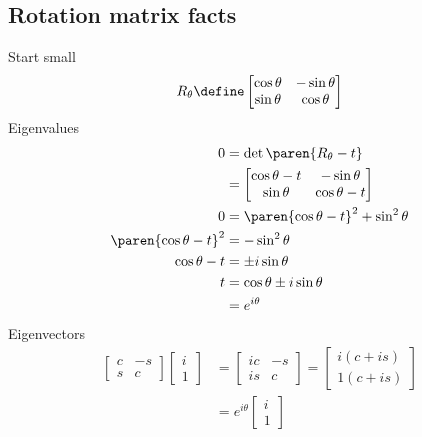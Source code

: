 \documentclass{scrartcl}
\begin{document}
\renewcommand{\b}{u}
\renewcommand{\R}{R}
\begin{multicols*}{2}
  \section{Rotation matrix facts}
  Start small
  \[
    R_\theta \define
    \begin{bmatrix}
      \cos \theta & -\sin\theta \\
      \sin\theta & \cos\theta
    \end{bmatrix}
  \]
  Eigenvalues
  \begin{align*}
    0&=\det\paren{R_\theta- t}\\
     &=
                              \begin{bmatrix}
                                \cos\theta - t & -\sin\theta \\
                                \sin\theta & \cos\theta - t
                              \end{bmatrix} \\
    0&=\paren{\cos\theta - t}^2 + \sin^2\theta \\
    \paren {\cos \theta - t}^2 &= -\sin^2\theta  \\
    \cos\theta - t &= \pm i\sin\theta \\
    t &= \cos\theta \pm i \sin\theta \\
    &= e^{i\theta}
  \end{align*}
  Eigenvectors
  \begin{align*}
    \begin{bmatrix}
      c & -s \\
      s & c
    \end{bmatrix}
    \begin{bmatrix}
      i \\ 1
    \end{bmatrix}
    &=
      \begin{bmatrix}
        ic & -s \\
        is & c
      \end{bmatrix}
      =
      \begin{bmatrix}
        i (c+is) \\
        1 (c+ is)
      \end{bmatrix} \\
    &= e^{i\theta}
      \begin{bmatrix}
        i \\ 1
      \end{bmatrix} \\

\end{align*}
\end{multicols*}
\end{document}
